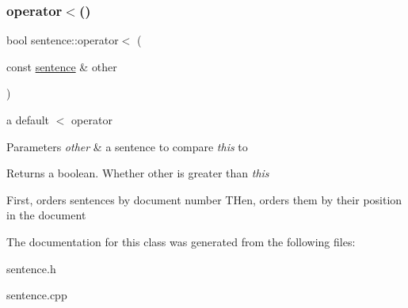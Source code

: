 \subsubsection{\texorpdfstring{operator$<$()}{operator<()}}
{\footnotesize\ttfamily bool sentence\+::operator$<$ (\begin{DoxyParamCaption}\item[{const \hyperlink{classsentence}{sentence} \&}]{other }\end{DoxyParamCaption})}



a default $<$ operator 


\begin{DoxyParams}{Parameters}
{\em other} & a sentence to compare {\itshape this} to \\
\hline
\end{DoxyParams}
\begin{DoxyReturn}{Returns}
a boolean. Whether other is greater than {\itshape this}
\end{DoxyReturn}
First, orders sentences by document number T\+Hen, orders them by their position in the document 

The documentation for this class was generated from the following files\+:\begin{DoxyCompactItemize}
\item 
sentence.\+h\item 
sentence.\+cpp\end{DoxyCompactItemize}
